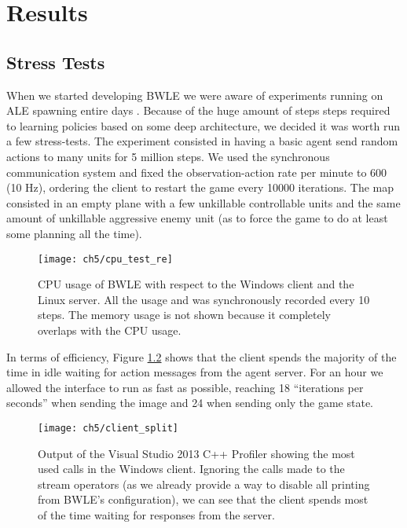 \chapter{Results}

\section{Stress Tests}

When we started developing BWLE we were aware of experiments running on ALE
spawning entire days \citep{mnih2015human}. Because of the huge amount of steps
steps required to learning policies based on some deep architecture, we decided
it was worth run a few stress-tests. The experiment consisted in having a basic
agent send random actions to many units for 5 million steps. We used the
synchronous communication system and fixed the observation-action rate per
minute to 600 (10 Hz), ordering the client to restart the game every 10000
iterations. The map consisted in an empty plane with a few unkillable
controllable units and the same amount of unkillable aggressive enemy unit (as
to force the game to do at least some planning all the time).

\begin{figure}[h]
    \centering
    \texttt{[image: ch5/cpu\_test\_re]}
    \caption{CPU usage of BWLE with respect to the Windows client and the Linux
      server. All the usage and was synchronously recorded every 10 steps. The
      memory usage is not shown because it completely overlaps with the CPU
      usage.}
    \label{fig:fst_usage}
\end{figure}

In terms of efficiency, Figure \ref{fig:tree} shows that the client spends the
majority of the time in idle waiting for action messages from the agent server.
For an hour we allowed the interface to run as fast as possible, reaching 18
``iterations per seconds'' when sending the image and 24 when sending only the
game state.  

\begin{figure}[h]
    \centering
    \texttt{[image: ch5/client\_split]}
    \caption{Output of the Visual Studio 2013 C++ Profiler showing the most used
      calls in the Windows client. Ignoring the calls made to the stream
      operators (as we already provide a way to disable all printing from BWLE's
      configuration), we can see that the client spends most of the time waiting
      for responses from the server.} 
    \label{fig:tree}
\end{figure}


